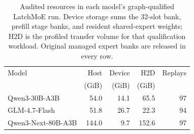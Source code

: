 \begin{table}[t]
  \centering
  \small
  \caption{Audited resources in each model's graph-qualified LatchMoE run. Device storage sums the 32-slot bank, prefill stage banks, and resident shared-expert weights; H2D is the profiled transfer volume for that qualification workload. Original managed expert banks are released in every row.}
  \label{tab:resources}
  \begin{tabular}{lrrrr}
    \toprule
    Model & Host & Device & H2D & Replays \\
          & (GiB) & (GiB) & (GiB) & \\
    \midrule
    Qwen3-30B-A3B & 54.0 & 14.1 & 65.5 & 97 \\
    GLM-4.7-Flash & 51.8 & 26.7 & 22.3 & 94 \\
    Qwen3-Next-80B-A3B & 144.0 & 9.7 & 152.6 & 97 \\
    \bottomrule
  \end{tabular}
\end{table}
